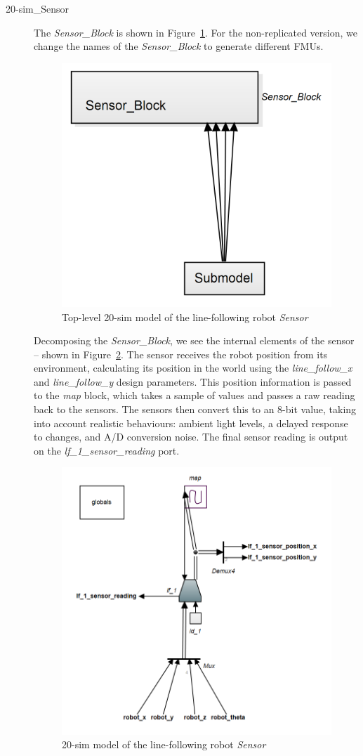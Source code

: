 \begin{description}
\item[20-sim\_Sensor] The \emph{Sensor\_Block} is shown in Figure~\ref{fig:linefollow20simsensor}.  For the non-replicated version, we change the names of the \emph{Sensor\_Block} to generate different FMUs.

\begin{figure}[htb!]
\begin{center}
 \includegraphics[width=0.45\linewidth]{linefollower/r2g2p_sensor1} 
\caption{Top-level 20-sim model of the line-following robot \emph{Sensor}}
\label{fig:linefollow20simsensor}
\end{center}
\end{figure}

Decomposing the \emph{Sensor\_Block}, we see the internal elements of the sensor -- shown in Figure~\ref{fig:linefollowbody20sensor2}. The sensor receives the robot position from its environment, calculating its position in the world using the \emph{line\_follow\_x} and \emph{line\_follow\_y} design parameters. This position information is passed to the \emph{map} block, which takes a sample of values and passes a raw reading back to the sensors. The sensors then convert this to an 8-bit value, taking into account realistic behaviours: ambient light levels, a delayed response to changes, and A/D conversion noise. The final sensor reading is output on the \emph{lf\_1\_sensor\_reading} port. 

\begin{figure}[htb!]
\begin{center}
\includegraphics[width=0.5\linewidth]{linefollower/r2g2p_sensor2} 
\caption{20-sim model of the line-following robot \emph{Sensor}}
\label{fig:linefollowbody20sensor2}
\end{center}
\end{figure}


\end{description}
